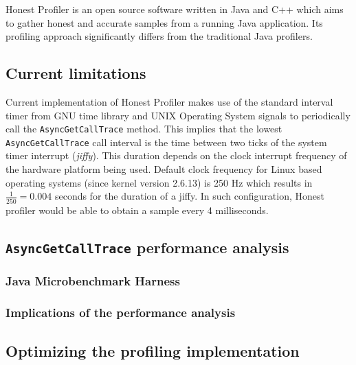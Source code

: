 \documentclass[..thesis.tex]{subfiles}
\begin{document}
Honest Profiler \cite{hon_prof} is an open source software written in Java and C++ which aims to gather honest and accurate samples from a running Java application. 
Its profiling approach significantly differs from the traditional Java profilers.

\subsection{Current limitations}
Current implementation of Honest Profiler makes use of the standard interval timer from GNU time library and UNIX Operating System signals to periodically call the \texttt{AsyncGetCallTrace} method. This implies that the lowest \texttt{AsyncGetCallTrace} call interval is the time between two ticks of the system timer interrupt (\textit{jiffy}). This duration depends on the clock interrupt frequency of the hardware platform being used. Default clock frequency for Linux based operating systems (since kernel version 2.6.13) is 250 Hz which results in $\frac{1}{250} = 0.004$ seconds for the duration of a jiffy. In such configuration, Honest profiler would be able to obtain a sample every 4 milliseconds.



\subsection{\texttt{AsyncGetCallTrace} performance analysis}

\subsubsection{Java Microbenchmark Harness}

\subsubsection{Implications of the performance analysis}

\subsection{Optimizing the profiling implementation}
\end{document}

